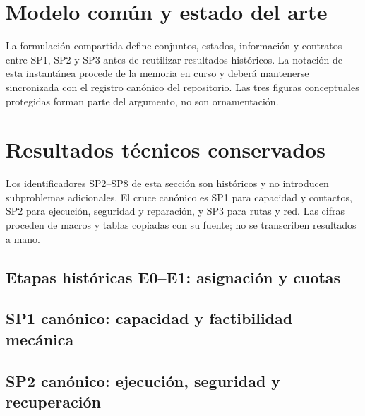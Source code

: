 \documentclass[12pt,a4paper]{article}
\begin{document}
\section{Modelo común y estado del arte}

La formulación compartida define conjuntos, estados, información y contratos entre SP1, SP2 y SP3 antes de reutilizar resultados históricos. La notación de esta instantánea procede de la memoria en curso y deberá mantenerse sincronizada con el registro canónico del repositorio. Las tres figuras conceptuales protegidas forman parte del argumento, no son ornamentación.





\section{Resultados técnicos conservados}

Los identificadores SP2--SP8 de esta sección son históricos y no introducen subproblemas adicionales. El cruce canónico es SP1 para capacidad y contactos, SP2 para ejecución, seguridad y reparación, y SP3 para rutas y red. Las cifras proceden de macros y tablas copiadas con su fuente; no se transcriben resultados a mano.

\subsection{Etapas históricas E0--E1: asignación y cuotas}


\subsection{SP1 canónico: capacidad y factibilidad mecánica}



\subsection{SP2 canónico: ejecución, seguridad y recuperación}




\end{document}
